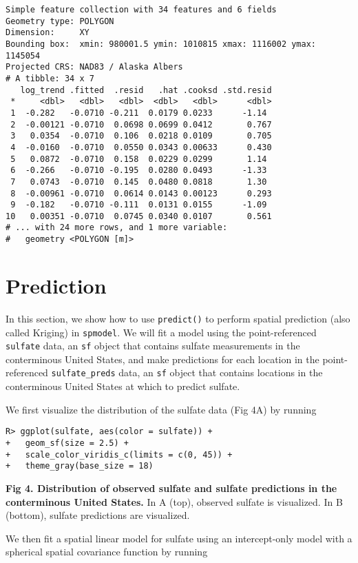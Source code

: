 \documentclass[10pt,letterpaper]{article}
\begin{document}
\begin{verbatim}
Simple feature collection with 34 features and 6 fields
Geometry type: POLYGON
Dimension:     XY
Bounding box:  xmin: 980001.5 ymin: 1010815 xmax: 1116002 ymax: 1145054
Projected CRS: NAD83 / Alaska Albers
# A tibble: 34 x 7
   log_trend .fitted  .resid   .hat .cooksd .std.resid
 *     <dbl>   <dbl>   <dbl>  <dbl>   <dbl>      <dbl>
 1  -0.282   -0.0710 -0.211  0.0179 0.0233      -1.14 
 2  -0.00121 -0.0710  0.0698 0.0699 0.0412       0.767
 3   0.0354  -0.0710  0.106  0.0218 0.0109       0.705
 4  -0.0160  -0.0710  0.0550 0.0343 0.00633      0.430
 5   0.0872  -0.0710  0.158  0.0229 0.0299       1.14 
 6  -0.266   -0.0710 -0.195  0.0280 0.0493      -1.33 
 7   0.0743  -0.0710  0.145  0.0480 0.0818       1.30 
 8  -0.00961 -0.0710  0.0614 0.0143 0.00123      0.293
 9  -0.182   -0.0710 -0.111  0.0131 0.0155      -1.09 
10   0.00351 -0.0710  0.0745 0.0340 0.0107       0.561
# ... with 24 more rows, and 1 more variable:
#   geometry <POLYGON [m]>
\end{verbatim}

\hypertarget{sec:prediction}{%
\section{Prediction}\label{sec:prediction}}

In this section, we show how to use \texttt{predict()} to perform
spatial prediction (also called Kriging) in \texttt{spmodel}. We will
fit a model using the point-referenced \texttt{sulfate} data, an
\texttt{sf} object that contains sulfate measurements in the
conterminous United States, and make predictions for each location in
the point-referenced \texttt{sulfate\_preds} data, an \texttt{sf} object
that contains locations in the conterminous United States at which to
predict sulfate.

We first visualize the distribution of the sulfate data (Fig 4A) by
running

\begin{verbatim}
R> ggplot(sulfate, aes(color = sulfate)) +
+   geom_sf(size = 2.5) +
+   scale_color_viridis_c(limits = c(0, 45)) +
+   theme_gray(base_size = 18)
\end{verbatim}

\textbf{Fig 4. Distribution of observed sulfate and sulfate predictions
in the conterminous United States.} In A (top), observed sulfate is
visualized. In B (bottom), sulfate predictions are visualized.

We then fit a spatial linear model for sulfate using an intercept-only
model with a spherical spatial covariance function by running
\end{document}
